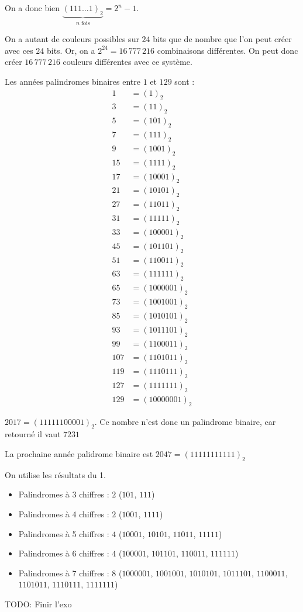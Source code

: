 On a donc bien $\underbrace{(111\dots1)_2}_{\text{$n$ fois}} = 2^n - 1$.

On a autant de couleurs possibles sur $24$ bits que de nombre que l'on peut créer avec ces $24$ bits. Or, on a $2^{24} =16\,777\,216$ combinaisons différentes. On peut donc créer $16\,777\,216$ couleurs différentes avec ce système.

\vspace{3em}

Les années palindromes binaires entre $1$ et $129$ sont :
\begin{equation*}
	\begin{split}
		1 & = (1)_2 \\
		3 & = (11)_2 \\
		5 & = (101)_2 \\
		7 & = (111)_2 \\
		9 & = (1001)_2 \\
		15 & = (1111)_2 \\
		17 & = (10001)_2 \\
		21 & = (10101)_2 \\
		27 & = (11011)_2 \\
		31 & = (11111)_2 \\
		33 & = (100001)_2 \\
		45 & = (101101)_2 \\
		51 & = (110011)_2 \\
		63 & = (111111)_2 \\
		65 & = (1000001)_2 \\
		73 & = (1001001)_2 \\
		85 & = (1010101)_2 \\
		93 & = (1011101)_2 \\
		99 & = (1100011)_2 \\
		107 & = (1101011)_2 \\
		119 & = (1110111)_2 \\
		127 & = (1111111)_2 \\
		129 & = (10000001)_2
	\end{split}
\end{equation*}

$2017 = (11111100001)_2$. Ce nombre n'est donc un palindrome binaire, car retourné il vaut $7231$

La prochaine année palidrome binaire est $2047 = (11111111111)_2$

On utilise les résultats du 1.

\begin{itemize}
	\item Palindromes à 3 chiffres : $2$ ($101$, $111$)
	\item Palindromes à 4 chiffres : $2$ ($1001$, $1111$)
	\item Palindromes à 5 chiffres : $4$ ($10001$, $10101$, $11011$, $11111$)
	\item Palindromes à 6 chiffres : $4$ ($100001$, $101101$, $110011$, $111111$)
	\item Palindromes à 7 chiffres : $8$ ($1000001$, $1001001$, $1010101$, $1011101$, $1100011$, $1101011$, $1110111$, $1111111$)
\end{itemize}


TODO: Finir l'exo